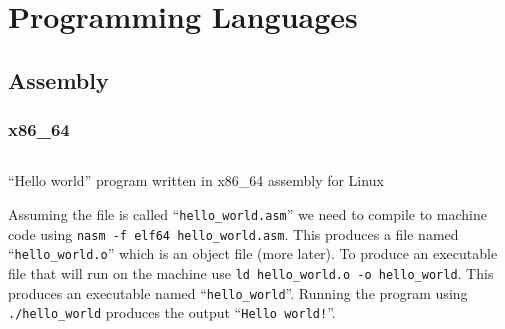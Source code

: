 \documentclass[12pt]{book}
\begin{document}
  \begin{titlepage}
  \end{titlepage}

  \tableofcontents

  
  
  

  \chapter{Programming Languages}

  \section{Assembly}

  \subsection{x86\_64}

  \begin{listing}[H]
    \inputminted[frame=lines]{asm}{code/hello_world.asm}
    \caption{``Hello world'' program written in x86\_64 assembly for Linux}
    \label{lst:hello-world-asm}
  \end{listing}

  Assuming the file is called ``\texttt{hello_world.asm}'' we need
  to compile to machine code using
  \texttt{nasm -f elf64 hello_world.asm}. This produces a file
  named ``\texttt{hello_world.o}'' which is an object file (more
  later). To produce an executable file that will run on the machine use
  \texttt{ld hello_world.o -o hello_world}. This produces an
  executable named ``\texttt{hello_world}''. Running the program
  using \texttt{./hello_world} produces the output
  ``\texttt{Hello world!}''.
\end{document}
